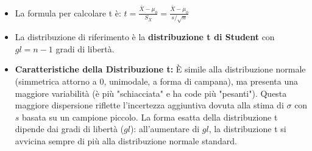 \documentclass[12pt, a4paper]{article}
\newcommand{\samplemean}{\bar{X}} %
\newcommand{\popsd}{\sigma} %
\newcommand{\samplesd}{s} %
\begin{document}
\begin{itemize}
\begin{itemize}
            \item La formula per calcolare t è: $t = \frac{\samplemean - \mu_0}{S_{\samplemean}} = \frac{\samplemean - \mu_0}{\samplesd / \sqrt{n}}$
            \item La distribuzione di riferimento è la \textbf{distribuzione t di Student} con $gl = n-1$ gradi di libertà.
            \item \textbf{Caratteristiche della Distribuzione t:} È simile alla distribuzione normale (simmetrica attorno a 0, unimodale, a forma di campana), ma presenta una maggiore variabilità (è più "schiacciata" e ha code più "pesanti"). Questa maggiore dispersione riflette l'incertezza aggiuntiva dovuta alla stima di $\popsd$ con $\samplesd$ basata su un campione piccolo. La forma esatta della distribuzione t dipende dai gradi di libertà ($gl$): all'aumentare di $gl$, la distribuzione t si avvicina sempre di più alla distribuzione normale standard.
        \end{itemize}
\end{itemize}
\end{document}
